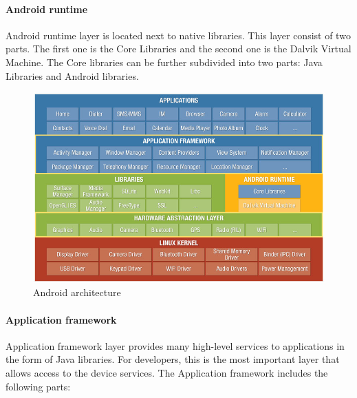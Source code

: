 \paragraph{Android runtime}
Android runtime layer is located next to native libraries. This layer consist of two parts. The first one is the Core Libraries and the second one is the Dalvik Virtual Machine. The Core libraries can be further subdivided into two parts: Java Libraries and Android libraries.
\\
\begin{figure}[h!]
    \centering
    \includegraphics[scale=0.5]{fig/android_architecture.jpg}
    \caption{Android architecture \cite{AndroidArch}}
    \label{androidArchitecture}
\end{figure}

\paragraph{Application framework}
Application framework layer provides many high-level services to applications in the form of Java libraries. For developers, this is the most important layer that allows access to the device services. The Application framework includes the following parts:
 
